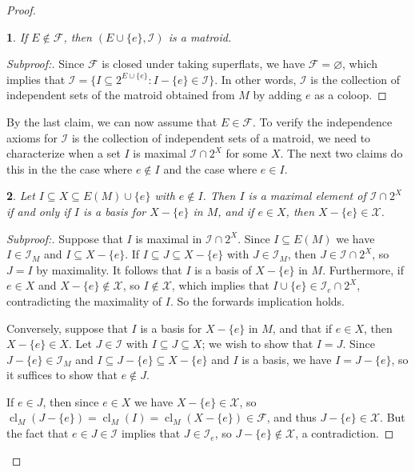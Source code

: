 \documentclass{amsart}
\theoremstyle{plain}
\newtheorem{claim}{}[theorem]
\theoremstyle{definition}
\newcommand{\cF}{\mathcal{F}}
\newcommand{\cI}{\mathcal{I}}
\newcommand{\cX}{\mathcal{X}}
\DeclareMathOperator{\cl}{cl}
\newcommand{\es}{\varnothing}
\renewcommand{\ss}{\subseteq}
\newenvironment{subproof}[1][\proofname]{%
  \renewcommand{\qedsymbol}{$\blacksquare$}%
  \begin{proof}[Subproof:]%
}{%
  \end{proof}%
}
\begin{document}
\begin{proof}
  


  \begin{claim}\label{notcoloop}
    If $E \notin \cF$, then $(E \cup \{e\}, \cI)$ is a matroid. 
  \end{claim}
  \begin{subproof}
    Since $\cF$ is closed under taking superflats, we have $\cF = \es$, which implies
    that $\cI = \{I \ss 2^{E \cup \{e\}} : I - \{e\} \in \cI\}$. In other words, 
    $\cI$ is the collection of independent sets of the matroid obtained from $M$ by adding 
    $e$ as a coloop. 
  \end{subproof}


  By the last claim, we can now assume that $E \in \cF$. To verify the independence axioms for $\cI$ 
  is the collection of independent sets of a matroid, we need to characterize 
  when a set $I$ is maximal $\cI \cap 2^X$ for some $X$. The next two claims
  do this in the the case where $e \notin I$ and the case where $e \in I$. 


  \begin{claim}\label{foo1}
    Let $I \ss X \ss E(M) \cup \{e\}$ with $e \notin I$.
    Then $I$ is a maximal element of $\cI \cap 2^X$ if and only if 
    $I$ is a basis for $X - \{e\}$ in $M$, and if $e \in X$, then $X - \{e\} \in \cX$. 
  \end{claim}
  \begin{subproof}
    Suppose that $I$ is maximal in $\cI \cap 2^X$. Since $I \subseteq E(M)$ we have 
    $I \in \cI_M$ and $I \ss X - \{e\}$. If $I \subseteq J \subseteq X - \{e\}$ with $J \in \cI_M$, 
    then $J \in \cI \cap 2^X$, so $J = I$ by maximality. It follows that $I$ is a basis of $X - \{e\}$ in $M$. Furthermore, if $e \in X$ and $X - \{e\} \notin \cX$, so $I \notin \cX$, 
    which implies that $I \cup \{e\} \in \cI_e \cap 2^X$, contradicting the maximality of $I$. 
    So the forwards implication holds. 
    
    Conversely, suppose that $I$ is a basis for $X - \{e\}$ in $M$, and that if $e \in X$, then $X - \{e\} \in X$. Let $J \in \cI$ with $I \ss J \ss X$; we wish to show that $I = J$. 
    Since $J - \{e\} \in \cI_M$
    and $I \ss J - \{e\} \ss X - \{e\}$ and $I$ is a basis, we have $I = J - \{e\}$, 
    so it suffices to show that $e \notin J$. 
    
    If $e \in J$, then since $e \in X$ we have $X - \{e\} \in \cX$, 
    so $\cl_M(J - \{e\}) = \cl_M(I) = \cl_M(X - \{e\}) \in \cF$, and thus $J - \{e\} \in \cX$. 
    But the fact that $e \in J \in \cI$ implies that $J \in \cI_e$, so $J - \{e\} \notin \cX$, 
    a contradiction. 
  \end{subproof}


\end{proof}
\end{document}
